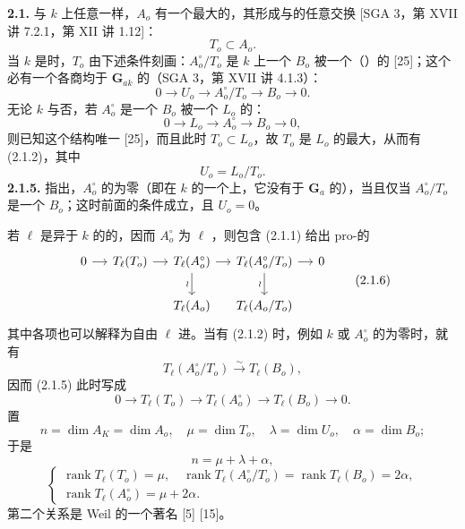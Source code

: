 \textbf{2.1.} 与 $k$ 上任意一样，$A_o$ 有一个最大的，其形成与的任意交换 [SGA 3，第 XVII 讲 7.2.1，第 XII 讲 1.12]：
\[T_o\subset A_o.\tag{2.1.1}\]
当 $k$ 是时，$T_o$ 由下述条件刻画：$A_o^\circ/T_o$ 是 $k$ 上一个 $B_o$ 被一个（）的 [25]；这个必有一个各商均于 $\mathbf G_{ak}$ 的（SGA 3，第 XVII 讲 4.1.3）：
\[0\longrightarrow U_o\longrightarrow A_o^\circ/T_o\longrightarrow B_o\longrightarrow0.\tag{2.1.2}\]
无论 $k$ 与否，若 $A_o^\circ$ 是一个 $B_o$ 被一个 $L_o$ 的：
\[0\longrightarrow L_o\longrightarrow A_o^\circ\longrightarrow B_o\longrightarrow0,\tag{2.1.3}\]
则已知这个结构唯一 [25]，而且此时 $T_o\subset L_o$，故 $T_o$ 是 $L_o$ 的最大，从而有 (2.1.2)，其中
\[U_o=L_o/T_o.\tag{2.1.4}\]
\textbf{2.1.5.} 指出，$A_o^\circ$ 的为零（即在 $k$ 的一个上，它没有于 $\mathbf G_a$ 的），当且仅当 $A_o^\circ/T_o$ 是一个 $B_o$；这时前面的条件成立，且 $U_o=0$。

若 $\ell$ 是异于 $k$ 的的，因而 $A_o^\circ$ 为 $\ell$ ，则包含 (2.1.1) 给出 pro-的
\[
\begin{tikzcd}[column sep=small]
0\arrow[r]&T_\ell(T_o)\arrow[r]&T_\ell(A_o^\circ)\arrow[r]\arrow[d,"\wr"']&T_\ell(A_o^\circ/T_o)\arrow[r]\arrow[d,"\wr"']&0\\
&&T_\ell(A_o)&T_\ell(A_o/T_o)&
\end{tikzcd}\tag{2.1.6}
\]
其中各项也可以解释为自由 $\ell$ 进。当有 (2.1.2) 时，例如 $k$ 或 $A_o^\circ$ 的为零时，就有
\[T_\ell(A_o^\circ/T_o)\xrightarrow\sim T_\ell(B_o),\tag{2.1.7}\]
因而 (2.1.5) 此时写成
\[0\longrightarrow T_\ell(T_o)\longrightarrow T_\ell(A_o^\circ)\longrightarrow T_\ell(B_o)\longrightarrow0.\tag{2.1.8}\]
置
\[n=\dim A_K=\dim A_o,\quad\mu=\dim T_o,\quad\lambda=\dim U_o,\quad\alpha=\dim B_o;\tag{2.1.9}\]
于是
\[n=\mu+\lambda+\alpha,\tag{2.1.10}\]
\[\begin{cases}
\operatorname{rank}T_\ell(T_o)=\mu,\quad\operatorname{rank}T_\ell(A_o^\circ/T_o)=\operatorname{rank}T_\ell(B_o)=2\alpha,\\
\operatorname{rank}T_\ell(A_o^\circ)=\mu+2\alpha.
\end{cases}\tag{2.1.11}\]
第二个关系是 Weil 的一个著名 [5] [15]。

